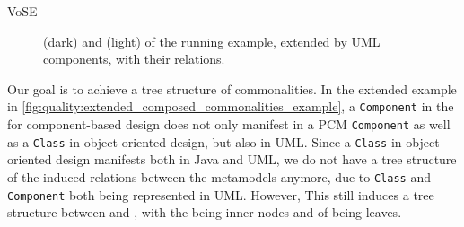 \begin{copiedFrom}{VoSE}

\begin{figure}
    \centering
    
    \caption[Concept metamodels in the running example]{\Conceptmetamodels (dark) and \concretemetamodels (light) of the running example, extended by UML components, with their relations.}
    \label{fig:quality:extended_composed_commonalities_example}
\end{figure}

Our goal is to achieve a tree structure of commonalities. In the extended example in \autoref{fig:quality:extended_composed_commonalities_example}, a \texttt{Component} in the \conceptmetamodel for component-based design does not only manifest in a \gls{PCM} \texttt{Component} as well as a \texttt{Class} in object-oriented design, but also in \gls{UML}.
Since a \texttt{Class} in object-oriented design manifests both in Java and \gls{UML}, we do not have a tree structure of the induced relations between the metamodels anymore, due to \texttt{Class} and \texttt{Component} both being represented in \gls{UML}.
However, This still induces a tree structure between \metaclasses and \commonalities, with the \commonalities being inner nodes and \metaclasses of \concretemetamodels being leaves.


\end{copiedFrom}
